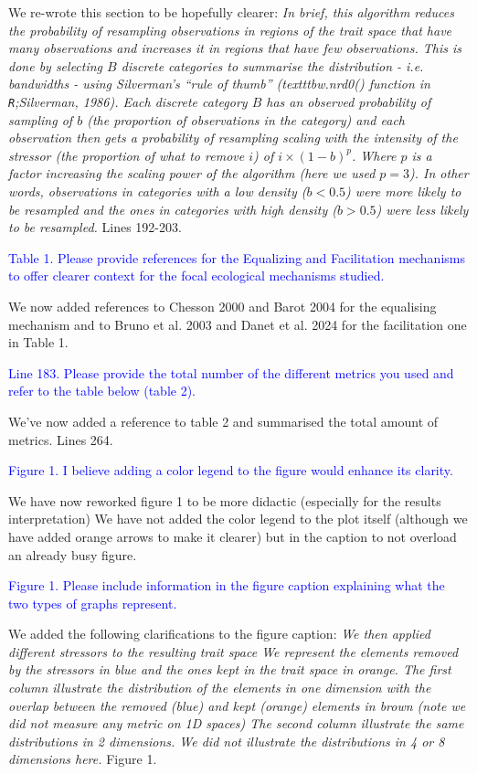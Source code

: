 \documentclass[
]{article}
\begin{document}
We re-wrote this section to be hopefully clearer:
\textit{In brief, this algorithm reduces the probability of resampling observations in regions of the trait space that have many observations and increases it in regions that have few observations.
This is done by selecting $B$ discrete categories to summarise the distribution - i.e. bandwidths - using Silverman's ``rule of thumb'' (texttt{bw.nrd0()} function in \texttt{R};Silverman, 1986).
Each discrete category $B$ has an observed probability of sampling of $b$ (the proportion of observations in the category) and each observation then gets a probability of resampling scaling with the intensity of the stressor (the proportion of what to remove $i$) of $i \times (1-b)^{p}$. 
Where $p$ is a factor increasing the scaling power of the algorithm (here we used $p=3$).
In other words, observations in categories with a low density ($b<0.5$) were more likely to be resampled and the ones in categories with high density ($b>0.5$) were less likely to be resampled.}
Lines 192-203.


\textcolor{blue}{Table 1. Please provide references for the Equalizing and Facilitation mechanisms to offer clearer context for the focal ecological mechanisms studied.}

We now added references to Chesson 2000 and Barot 2004 for the equalising mechanism and to Bruno et al. 2003 and Danet et al. 2024 for the facilitation one in Table 1.

\textcolor{blue}{Line 183. Please provide the total number of the different metrics you used and refer to the table below (table 2).}

We've now added a reference to table 2 and summarised the total amount of metrics.
Lines 264.

\textcolor{blue}{Figure 1. I believe adding a color legend to the figure would enhance its clarity.}

We have now reworked figure 1 to be more didactic (especially for the results interpretation)
We have not added the color legend to the plot itself (although we have added orange arrows to make it clearer) but in the caption to not overload an already busy figure.

\textcolor{blue}{Figure 1. Please include information in the figure caption explaining what the two types of graphs represent.}

We added the following clarifications to the figure caption:
\textit{We then applied different stressors to the resulting trait space
We represent the elements removed by the stressors in blue and the ones kept in the trait space in orange.
The first column illustrate the distribution of the elements in one dimension with the overlap between the removed (blue) and kept (orange) elements in brown (note we did not measure any metric on 1D spaces)
The second column illustrate the same distributions in 2 dimensions.
We did not illustrate the distributions in 4 or 8 dimensions here.}
Figure 1.
\end{document}
